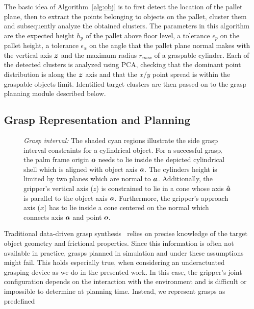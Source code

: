 The basic idea of Algorithm~\ref{alg:obj} is to first detect the location of the pallet plane, then
to extract the points belonging to objects on the pallet, cluster them and subsequently analyze the
obtained clusters. The parameters in this algorithm are the expected height $h_p$ of the
pallet above floor level, a tolerance $\epsilon_p$ on the pallet height, a tolerance
$\epsilon_{\alpha}$ on the angle that the pallet plane normal makes with the vertical axis $\mbox{\boldmath $z$}$
and the maximum radius $r_{max}$ of a graspable cylinder. Each of the detected clusters is analyzed
using PCA, checking that the dominant point distribution is along the $\mbox{\boldmath $z$}$ axis and that the
$x/y$ point spread is within the graspable objects limit. Identified target clusters are then passed
on to the grasp planning module described below.
%
\subsection{Grasp Representation and Planning}
\label{subsec:grasp_planning}
%
\begin{figure}[t!] 
   \centering
    \def\svgwidth{235pt} 
     
    \caption{\textit{Grasp interval:} The shaded cyan regions illustrate the side grasp interval
      constraints for a cylindrical object. For a successful grasp, the palm frame origin $\mbox{\boldmath $o$}$
      needs to lie inside the depicted cylindrical shell which is aligned with object axis
      $\mbox{\boldmath $a$}$. The cylinders height is limited by two planes which are normal to
      $\mbox{\boldmath $a$}$. Additionally, the gripper's vertical axis ($z$) is constrained to lie in a cone
      whose axis $\hat{\mbox{\boldmath $a$}}$ is parallel to the object axis $\mbox{\boldmath $a$}$. Furthermore, the
      gripper's approach axis ($x$) has to lie inside a cone centered on the normal which connects
      axis $\mbox{\boldmath $a$}$ and point $\mbox{\boldmath $o$}$.}
   \label{fig:grasp_interval}
   \vspace{-0.5cm}
\end{figure}
%
Traditional data-driven grasp synthesis~\cite{Bohg14} relies on precise knowledge of the target
object geometry and frictional properties. Since this information is often not available in
practice, grasps planned in simulation and under these assumptions might fail. This holds especially
true, when considering an underactuated grasping device as we do in the presented work. In this
case, the gripper's joint configuration depends on the interaction with the environment and is
difficult or impossible to determine at planning time. Instead, we represent grasps as predefined
